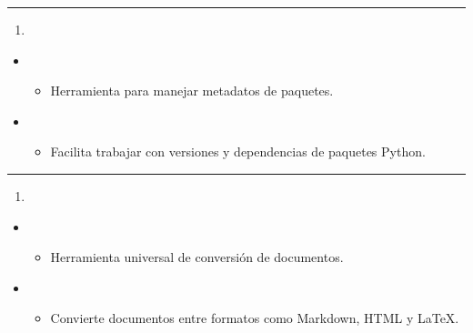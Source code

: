 \documentclass[a4paper,10pt,oneside,spanish,openany]{sphinxmanual}
\begin{document}
\bigskip\hrule\bigskip

\begin{enumerate}
%
\setcounter{enumi}{14}
\item {} 
\sphinxAtStartPar
{}

\end{enumerate}
\begin{itemize}
\item {} 
\sphinxAtStartPar
{}
\begin{itemize}
\item {} 
\sphinxAtStartPar
Herramienta para manejar metadatos de paquetes.

\end{itemize}

\item {} 
\sphinxAtStartPar
{}
\begin{itemize}
\item {} 
\sphinxAtStartPar
Facilita trabajar con versiones y dependencias de paquetes Python.

\end{itemize}

\end{itemize}


\bigskip\hrule\bigskip

\begin{enumerate}
%
\setcounter{enumi}{15}
\item {} 
\sphinxAtStartPar
{}

\end{enumerate}
\begin{itemize}
\item {} 
\sphinxAtStartPar
{}
\begin{itemize}
\item {} 
\sphinxAtStartPar
Herramienta universal de conversión de documentos.

\end{itemize}

\item {} 
\sphinxAtStartPar
{}
\begin{itemize}
\item {} 
\sphinxAtStartPar
Convierte documentos entre formatos como Markdown, HTML y LaTeX.

\end{itemize}

\end{itemize}
\end{document}
